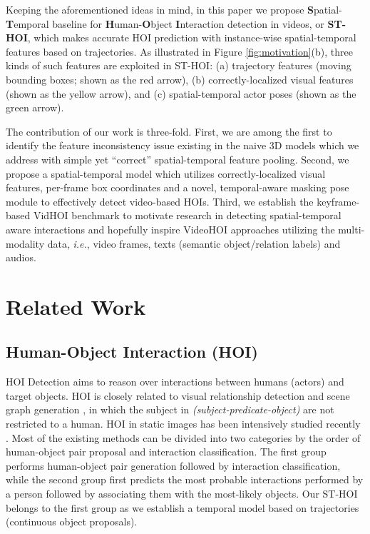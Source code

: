 \documentclass[sigconf]{acmart}
\begin{document}
Keeping the aforementioned ideas in mind, in this paper we propose \textbf{S}patial-\textbf{T}emporal baseline for \textbf{H}uman-\textbf{O}bject \textbf{I}nteraction detection in videos, or \textbf{ST-HOI}, which makes accurate HOI prediction with instance-wise spatial-temporal features based on trajectories. As illustrated in Figure \ref{fig:motivation}(b), three kinds of such features are exploited in ST-HOI: (a) trajectory features (moving bounding boxes; shown as the red arrow), (b) correctly-localized visual features (shown as the yellow arrow), and (c) spatial-temporal actor poses (shown as the green arrow). 

The contribution of our work is three-fold. First, we are among the first to identify the feature inconsistency issue existing in the naive 3D models which we address with simple yet “correct” spatial-temporal feature pooling.
Second, we propose a spatial-temporal model which utilizes correctly-localized visual features, per-frame box coordinates and a novel, temporal-aware masking pose module to effectively detect video-based HOIs.
Third, we establish the keyframe-based VidHOI benchmark to motivate research in detecting spatial-temporal aware interactions and hopefully inspire VideoHOI approaches utilizing the multi-modality data, \emph{i.e.}, video frames, texts (semantic object/relation labels) and audios.



\section{Related Work}
\label{sec:related_work}

\subsection{Human-Object Interaction (HOI)}
\label{subsec:hoi}
HOI Detection aims to reason over interactions between humans (actors) and target objects. 
HOI is closely related to visual relationship detection \cite{lu2016visual,chiou2021visual} and scene graph generation \cite{xu2017scene}, in which the subject in \textit{(subject-predicate-object)} are not restricted to a human. 
HOI in static images has been intensively studied recently \cite{smith2013gaze,chao2018learning,gao2018ican,qi2018learning,li2019transferable,wang2019deep,wan2019pose,gupta2019no,li2020pastanet,wang2020learning,liao2020ppdm,ulutan2020vsgnet,zhong2020polysemy}. 
Most of the existing methods can be divided into two categories by the order of human-object pair proposal and interaction classification. 
The first group \cite{gao2018ican,chao2018learning,li2019transferable,wang2019deep,wan2019pose,gupta2019no,ulutan2020vsgnet,li2020pastanet} performs human-object pair generation followed by interaction classification, while the second group \cite{gkioxari2018detecting,qi2018learning,wang2020learning,liao2020ppdm} first predicts the most probable interactions performed by a person followed by associating them with the most-likely objects.
Our ST-HOI belongs to the first group as we establish a temporal model based on trajectories (continuous object proposals).
\end{document}
